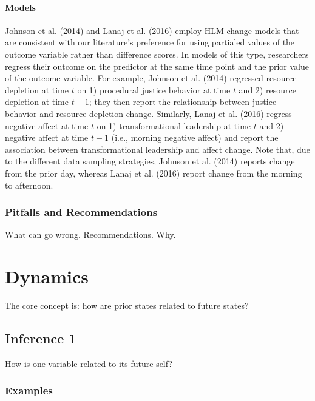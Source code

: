 \documentclass[english,,man]{apa6}
\let\oldparagraph\paragraph
\renewcommand{\paragraph}[1]{\oldparagraph{#1}\mbox{}}
\theoremstyle{definition}
\theoremstyle{definition}
\theoremstyle{definition}
\theoremstyle{remark}
\begin{document}
\hypertarget{models-6}{%
\paragraph{Models}\label{models-6}}

Johnson et al. (2014) and Lanaj et al. (2016) employ HLM change models
that are consistent with our literature's preference for using partialed
values of the outcome variable rather than difference scores. In models
of this type, researchers regress their outcome on the predictor at the
same time point and the prior value of the outcome variable. For
example, Johnson et al. (2014) regressed resource depletion at time
\(t\) on 1) procedural justice behavior at time \(t\) and 2) resource
depletion at time \(t-1\); they then report the relationship between
justice behavior and resource depletion change. Similarly, Lanaj et al.
(2016) regress negative affect at time \(t\) on 1) transformational
leadership at time \(t\) and 2) negative affect at time \(t-1\) (i.e.,
morning negative affect) and report the association between
transformational leadership and affect change. Note that, due to the
different data sampling strategies, Johnson et al. (2014) reports change
from the prior day, whereas Lanaj et al. (2016) report change from the
morning to afternoon.

\hypertarget{pitfalls-and-recommendations-6}{%
\subsubsection{Pitfalls and
Recommendations}\label{pitfalls-and-recommendations-6}}

What can go wrong. Recommendations. Why.

\hypertarget{dynamics}{%
\section{Dynamics}\label{dynamics}}

The core concept is: how are prior states related to future states?

\hypertarget{inference-1-3}{%
\subsection{Inference 1}\label{inference-1-3}}

How is one variable related to its future self?

\hypertarget{examples-7}{%
\subsubsection{Examples}\label{examples-7}}
\end{document}
